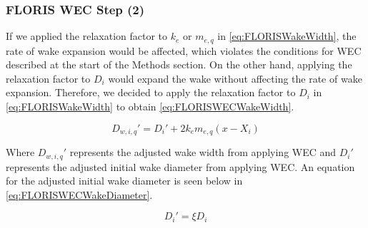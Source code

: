 \documentclass[a4paper]{jpconf}
\begin{document}
\subsubsection{FLORIS WEC Step (2)}

If we applied the relaxation factor to $k_e$ or $m_{e,q}$ in \cref{eq:FLORISWakeWidth}, the rate of wake expansion would be affected, which violates the conditions for WEC described at the start of the Methods section. On the other hand, applying the relaxation factor to $D_i$ would expand the wake without affecting the rate of wake expansion. Therefore, we decided to apply the relaxation factor to $D_i$ in \cref{eq:FLORISWakeWidth} to obtain \cref{eq:FLORISWECWakeWidth}.

\begin{equation}
    D_{w,i,q}' = D_i' + 2k_em_{e,q}(x - X_i)
    \label{eq:FLORISWECWakeWidth}
\end{equation}

Where $D_{w,i,q}'$ represents the adjusted wake width from applying WEC and $D_i'$ represents the adjusted initial wake diameter from applying WEC. An equation for the adjusted initial wake diameter is seen below in \cref{eq:FLORISWECWakeDiameter}.

\begin{equation}
    D_i' = \xi D_i
    \label{eq:FLORISWECWakeDiameter}
\end{equation}

\end{document}
